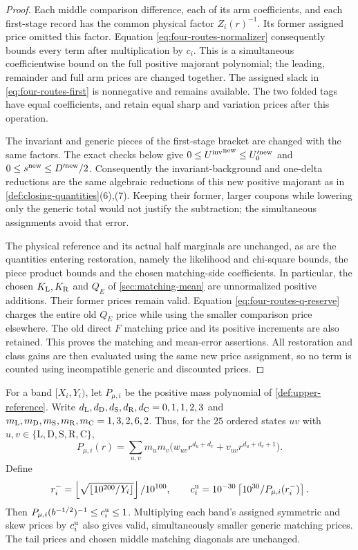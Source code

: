 \begin{proof}
Each middle comparison difference, each of its arm coefficients, and
each first-stage record has the common physical factor $Z_i(r)^{-1}$.
Its former assigned price omitted this factor. Equation
\eqref{eq:four-routes-normalizer} consequently bounds every term after
multiplication by $c_i$. This is a simultaneous coefficientwise bound
on the full positive majorant polynomial; the leading, remainder and
full arm prices are changed together. The assigned slack in
\eqref{eq:four-routes-first} is nonnegative and remains available.
The two folded tags have equal coefficients, and retain equal sharp
and variation prices after this operation.

The invariant and generic pieces of the first-stage bracket are changed
with the same factors. The exact checks below give
$0\le{\Uinv}^{\rm new}\le U_0^{\prime\rm new}$ and
$0\le s^{\rm new}\le D^{\prime\rm new}/2$. Consequently the
invariant-background and one-delta reductions are the same algebraic
reductions of this new positive majorant as in
\cref{def:closing-quantities}(6),(7). Keeping their former, larger
coupons while lowering only the generic total would not justify the
subtraction; the simultaneous assignments avoid that error.

The physical reference and its actual half marginals are unchanged, as are the quantities entering restoration, namely the likelihood and chi-square bounds, the piece product bounds and the chosen matching-side coefficients. In particular, the chosen $K_{\rm L},K_{\rm R}$
and $Q_E$ of \cref{sec:matching-mean} are unnormalized positive
additions. Their former prices remain valid. Equation
\eqref{eq:four-routes-q-reserve} charges the entire old $Q_E$ price
while using the smaller comparison price elsewhere. The old direct
$F$ matching price and its positive increments are also retained.
This proves the matching and mean-error assertions. All restoration
and class gains are then evaluated using the same new price assignment,
so no term is counted using incompatible generic and discounted prices.
\end{proof}

\begin{lemma}\label{lem:four-routes-upper-normalized}
For a band $[X_i,Y_i)$, let $P_{\mu,i}$ be the positive mass polynomial
of \cref{def:upper-reference}. Write
$d_{\rm L},d_{\rm D},d_{\rm S},d_{\rm R},d_{\rm C}=0,1,1,2,3$ and
$m_{\rm L},m_{\rm D},m_{\rm S},m_{\rm R},m_{\rm C}=1,3,2,6,2$.
Thus, for the $25$ ordered states $uv$ with $u,v\in\{\mathrm L,\mathrm D,\mathrm S,\mathrm R,\mathrm C\}$,
\[
 P_{\mu,i}(r)=\sum_{u,v}m_um_v
       \bigl(w_{uv}r^{d_u+d_v}+v_{uv}r^{d_u+d_v+1}\bigr).
\]
Define
\[
 r_i^-=\frac{\left\lfloor\sqrt{\lfloor10^{200}/Y_i\rfloor}\right\rfloor}{10^{100}},
 \qquad c_i^{\rm u}=10^{-30}\left\lceil\frac{10^{30}}{P_{\mu,i}(r_i^-)}\right\rceil.
\]
Then $P_{\mu,i}(b^{-1/2})^{-1}\le c_i^{\rm u}\le1$.
Multiplying each band's assigned symmetric and skew prices by
$c_i^{\rm u}$ also gives valid, simultaneously smaller generic matching
prices. The tail prices and chosen middle matching diagonals are unchanged.
\end{lemma}

